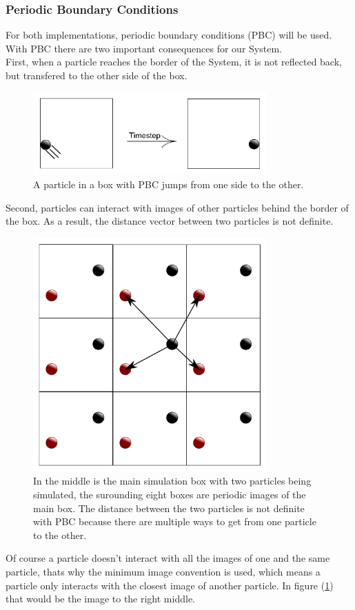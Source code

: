 \subsubsection*{Periodic Boundary Conditions}
For both implementations, periodic boundary conditions (PBC) will be used.
With PBC there are two important consequences for our System. \\
First, when a particle reaches the border of the System, it is not reflected back, but transfered to the other side of the box.
\begin{figure}[h!]
\centering
\includegraphics[width=0.8\textwidth]{PBCjump.pdf}
\caption{A particle in a box with PBC jumps from one side to the other.}
\end{figure}
Second, particles can interact with images of other particles behind the border of the box. As a result, the distance vector between two particles is not definite. 
\begin{figure}[h!]
\centering
\includegraphics[width=0.8\textwidth]{PBCinteraction.pdf}
\caption{In the middle is the main simulation box with two particles being simulated, the surounding eight boxes are periodic images of the main box. The distance between the two particles is not definite with PBC because there are multiple ways to get from one particle to the other.}
\label{PBCinteraction}
\end{figure}
Of course a particle doesn't interact with all the images of one and the same particle, thats why the minimum image convention is used, which means a particle only interacts with the closest image of another particle. In figure (\ref{PBCinteraction}) that would be the image to the right middle.





